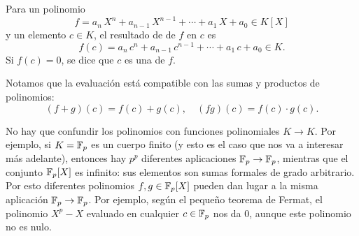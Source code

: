 \documentclass{article}
\theoremstyle{plain}
\begin{document}
\begin{definicion}
  Para un polinomio
  $$f = a_n\,X^n + a_{n-1}\,X^{n-1} + \cdots + a_1\,X + a_0 \in K [X]$$
  y un elemento $c \in K$, el resultado de  de $f$ en $c$ es
  $$f (c) = a_n\,c^n + a_{n-1}\,c^{n-1} + \cdots + a_1\,c + a_0 \in K.$$
  Si $f (c) = 0$, se dice que $c$ es una  de $f$.
\end{definicion}

Notamos que la evaluación está compatible con las sumas y productos de
polinomios:
$$(f+g) (c) = f (c) + g (c), \quad (fg) (c) = f (c) \cdot g (c).$$

\begin{comentario}
  No hay que confundir los polinomios con funciones polinomiales $K\to K$. Por
  ejemplo, si $K = \mathbb{F}_p$ es un cuerpo finito (y esto es el caso que nos va a
  interesar más adelante), entonces hay $p^p$ diferentes aplicaciones
  $\mathbb{F}_p \to \mathbb{F}_p$, mientras que el conjunto $\mathbb{F}_p [X]$ es infinito: sus
  elementos son sumas formales de grado arbitrario. Por esto diferentes
  polinomios $f,g \in \mathbb{F}_p [X]$ pueden dan lugar a la misma aplicación
  $\mathbb{F}_p \to \mathbb{F}_p$. Por ejemplo, según el pequeño teorema de Fermat, el
  polinomio $X^p - X$ evaluado en cualquier $c \in \mathbb{F}_p$ nos da $0$, aunque
  este polinomio no es nulo.
\end{comentario}
\end{document}
